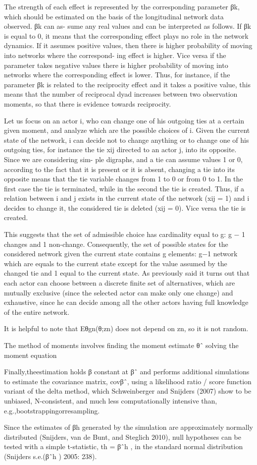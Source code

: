 The strength of each effect is represented by the corresponding parameter βk, which should be estimated on the basis of the longitudinal network data observed. βk can as- sume any real values and can be interpreted as follows. If βk is equal to 0, it means that the corresponding effect plays no role in the network dynamics. If it assumes positive values, then there is higher probability of moving into networks where the correspond- ing effect is higher. Vice versa if the parameter takes negative values there is higher probability of moving into networks where the corresponding effect is lower. Thus, for instance, if the parameter βk is related to the reciprocity effect and it takes a positive value, this means that the number of reciprocal dyad increases between two observation moments, so that there is evidence towards reciprocity.

Let us focus on an actor i, who can change one of his outgoing ties at a certain given moment, and analyze which are the possible choices of i. Given the current state of the network, i can decide not to change anything or to change one of his outgoing ties, for instance the tie xij directed to an actor j, into its opposite. Since we are considering sim- ple digraphs, and a tie can assume values 1 or 0, according to the fact that it is present or it is absent, changing a tie into its opposite means that the tie variable changes from 1 to 0 or from 0 to 1. In the first case the tie is terminated, while in the second the tie is created. Thus, if a relation between i and j exists in the current state of the network (xij = 1) and i decides to change it, the considered tie is deleted (xij = 0). Vice versa the tie is created.

This suggests that the set of admissible choice has cardinality equal to g: g − 1 changes and 1 non-change. Consequently, the set of possible states for the considered network given the current state contains g elements: g−1 network which are equals to the current state except for the value assumed by the changed tie and 1 equal to the current state. As previously said it turns out that each actor can choose between a discrete finite set of alternatives, which are mutually exclusive (since the selected actor can make only one change) and exhaustive, since he can decide among all the other actors having full knowledge of the entire network.

It is helpful to note that Eθ{gn(θ;zn)} does not depend on zn, so it is not random. 

The method of moments involves finding the moment estimate θˆ solving the moment equation

Finally,theestimation holds β constant at βˆ and performs additional simulations to estimate the covariance matrix, covβˆ, using a likelihood ratio / score function variant of the delta method, which Schweinberger and Snijders (2007) show to be unbiased, N-consistent, and much less computationally intensive than, e.g.,bootstrappingorresampling.

Since the estimates of βh generated by the simulation are approximately normally distributed (Snijders, van de Bunt, and Steglich 2010), null hypotheses can be tested with a simple t-statistic, th = βˆh , in the standard normal distribution (Snijders s.e.(βˆh ) 2005: 238).
